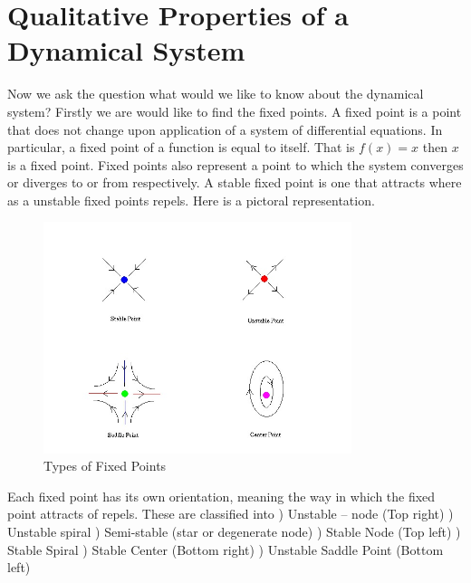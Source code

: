 \documentclass{article}
\begin{document}
\section{Qualitative Properties of a Dynamical System}
Now we ask the question what would we like to know about the dynamical system?
\newline
\linebreak
Firstly we are would like to find the fixed points. A fixed point is a point that does not change upon application of a system of differential equations. In particular, a fixed point of a function is equal to itself. That is $f(x) = x$ then $x$ is a fixed point.
\newline
\linebreak
Fixed points also represent a point to which the system converges or diverges to or from respectively. A stable fixed point is one that attracts where as  a unstable fixed points repels.  Here is a pictoral representation.
\begin{figure}[ht!]
\centering
\includegraphics[width=90mm]{points.jpg}
\caption{Types of Fixed Points}
\label{overflow}
\end{figure}
\newline
Each fixed point has its own orientation, meaning the way in which the fixed point attracts of repels. 
These are classified into
\newline
{}) Unstable – node (Top right)
) Unstable spiral
) Semi-stable (star or degenerate node)
) Stable Node (Top left)
) Stable Spiral
) Stable Center (Bottom right)
) Unstable Saddle Point (Bottom left)
\newpage
\end{document}
